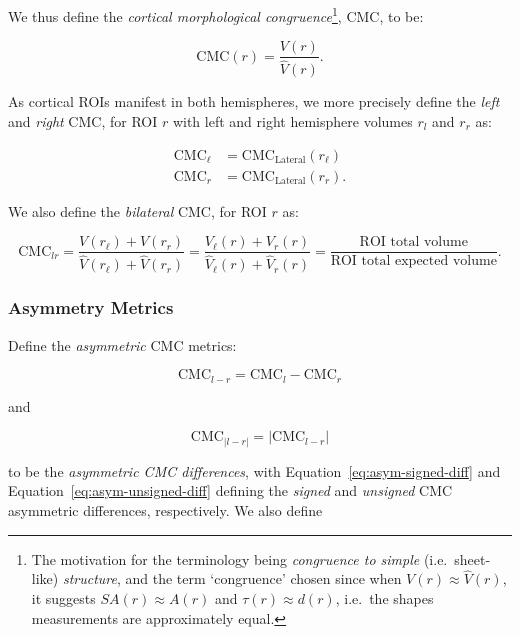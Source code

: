 \documentclass{article}
\begin{document}
We thus define the \emph{cortical morphological congruence}\footnote{The
motivation for the terminology being \emph{congruence to simple} (i.e.\
sheet-like) \emph{structure}, and the term `congruence' chosen since when
\(V(r) \approx \hat{V}(r)\), it suggests \(SA(r) \approx A(r)\) and \(\tau(r)
\approx d(r)\), i.e.\ the shapes measurements are approximately equal.}, CMC,
to be:

\begin{equation}
\text{CMC}(r) = \frac{V(r)}{\hat{V}(r)}.
\end{equation}

As cortical ROIs manifest in both hemispheres, we more precisely define the \emph{left}
and \emph{right} CMC, for ROI \(r\) with left and right
hemisphere volumes \(r_l\) and \(r_r\) as:

\begin{align}
\label{eq:cmc-laterals}
\text{CMC}_{\ell} &= \text{CMC}_{\text{Lateral}}(r_{\ell}) \\
\text{CMC}_r &= \text{CMC}_{\text{Lateral}}(r_r).
\end{align}

We also define the \emph{bilateral} CMC, for ROI \(r\) as:

\begin{equation} \label{eq:cmc-bilateral}
\text{CMC}_{lr}
=\frac{V(r_{\ell}) + V(r_r)}{\hat{V}(r_{\ell}) + \hat{V}(r_r)}
=\frac{V_{\ell}(r) + V_r(r)}{\hat{V}_{\ell}(r) + \hat{V}_r(r)}
=\frac{\text{ROI total volume}}{\text{ROI total expected volume}}.
\end{equation}



\subsubsection{Asymmetry Metrics}

Define the \emph{asymmetric} CMC metrics:

\begin{equation} \label{eq:asym-signed-diff}
\text{CMC}_{l - r} = \text{CMC}_{l} - \text{CMC}_{r}
\end{equation}

and

\begin{equation} \label{eq:asym-unsigned-diff}
\text{CMC}_{|l - r|} = \lvert\text{CMC}_{l - r} \rvert
\end{equation}

to be the \emph{asymmetric CMC differences}, with
Equation~\ref{eq:asym-signed-diff} and Equation~\ref{eq:asym-unsigned-diff}
defining the \emph{signed} and \emph{unsigned} CMC asymmetric differences,
respectively. We also define
\end{document}
